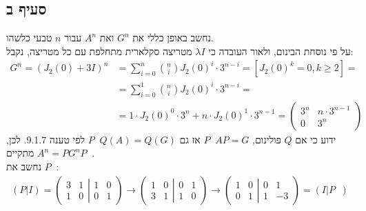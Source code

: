 \documentclass{article}
\DeclareMathOperator{\inv}{^{-1}}
\begin{document}
\subsection*{סעיף ב}
נחשב באופן כללי את $G^n$ ואת $A^n$ עבור $n$ טבעי כלשהו. \\
על פי נוסחת הבינום, ולאור העובדה כי $\lambda I$ מטריצה סקלארית מתחלפת עם כל מטריצה, נקבל:
\begin{align*}
    G^n = (J_2(0)+3I)^n & =\sum_{i=0}^{n} { n \choose i } J_2(0)^i \cdot 3^{n-i}=   [J_2(0)^k = 0, k \geq 2]= \\
                        & =\sum_{i=0}^{1} { n \choose i } J_2(0)^i \cdot 3^{n-i}=                             \\
                        & = 1 \cdot J_2(0)^0 \cdot 3^n + n \cdot J_2(0)^1 \cdot 3^{n-1}=\begin{pmatrix}
                                                                                            3^n & n \cdot 3^{n-1} \\
                                                                                            0   & 3^n
                                                                                        \end{pmatrix}
\end{align*}
ידוע כי אם $Q$ פולינום, $P\inv A P = G$ אז גם $P\inv Q(A)=Q(G)$ לפי טענה 9.1.7. לכן, מתקיים $A^n=PG^nP\inv$.\\
נחשב את $P\inv$:
\begin{align*}
    (P | I) = \left(
    \begin{matrix}
        3 & 1 \\
        1 & 0
    \end{matrix}
    \left|
    \begin{matrix}
        1 & 0 \\
        0 & 1
    \end{matrix}
    \right.
    \right)
    \rightarrow
    \left(
    \begin{matrix}
        1 & 0 \\
        3 & 1
    \end{matrix}
    \left|
    \begin{matrix}
        0 & 1 \\
        1 & 0
    \end{matrix}
    \right.
    \right)
    \rightarrow
    \left(
    \begin{matrix}
        1 & 0 \\
        0 & 1
    \end{matrix}
    \left|
    \begin{matrix}
        0 & 1  \\
        1 & -3
    \end{matrix}
    \right.
    \right)
    =(I | P\inv)
\end{align*}
\end{document}
